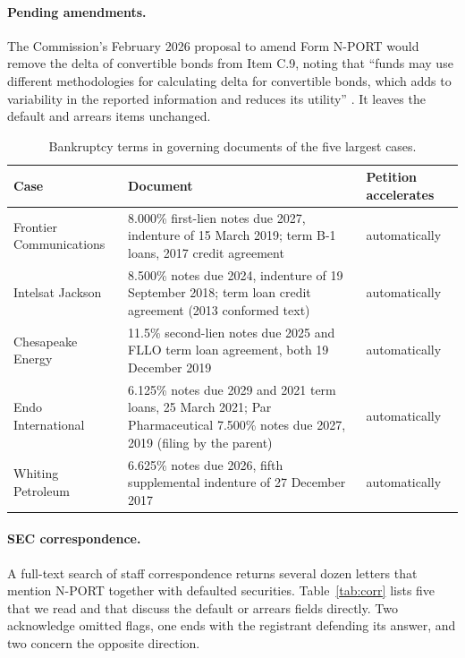 \documentclass[11pt]{article}
\begin{document}
\paragraph{Pending amendments.} The Commission's February 2026 proposal to amend Form N-PORT would
remove the delta of convertible bonds from Item C.9, noting that ``funds may use different
methodologies for calculating delta for convertible bonds, which adds to variability in the reported
information and reduces its utility'' \citep{sec_2026_proposal}. It leaves the default and arrears items
unchanged.

\begin{table}[!htb]
\centering\small
\caption{Bankruptcy terms in governing documents of the five largest cases.}\label{tab:contracts}
\begin{tabularx}{\textwidth}{@{}l X l@{}}
\toprule
Case & Document & Petition accelerates \\
\midrule
Frontier Communications & 8.000\% first-lien notes due 2027, indenture of 15 March 2019; term B-1 loans, 2017 credit agreement & automatically \\
Intelsat Jackson & 8.500\% notes due 2024, indenture of 19 September 2018; term loan credit agreement (2013 conformed text) & automatically \\
Chesapeake Energy & 11.5\% second-lien notes due 2025 and FLLO term loan agreement, both 19 December 2019 & automatically \\
Endo International & 6.125\% notes due 2029 and 2021 term loans, 25 March 2021; Par Pharmaceutical 7.500\% notes due 2027, 2019 (filing by the parent) & automatically \\
Whiting Petroleum & 6.625\% notes due 2026, fifth supplemental indenture of 27 December 2017 & automatically \\
\bottomrule
\end{tabularx}
\end{table}

\paragraph{SEC correspondence.} A full-text search of staff correspondence returns several dozen letters
that mention N-PORT together with defaulted securities. Table~\ref{tab:corr} lists five that we read and
that discuss the default or arrears fields directly. Two acknowledge omitted flags, one ends with the
registrant defending its answer, and two concern the opposite direction.
\end{document}
